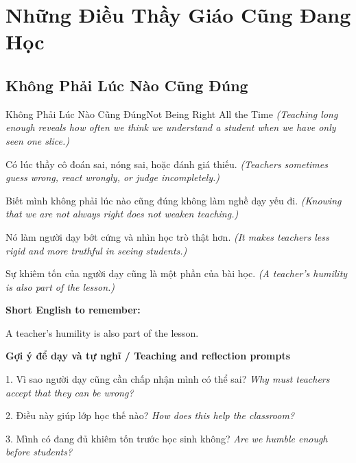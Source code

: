 \chapter{Những Điều Thầy Giáo Cũng Đang Học}

\section{Không Phải Lúc Nào Cũng Đúng}
\begin{truyen}{Không Phải Lúc Nào Cũng Đúng}{Not Being Right All the Time}
\textit{(Teaching long enough reveals how often we think we understand a student when we have only seen one slice.)}

Có lúc thầy cô đoán sai, nóng sai, hoặc đánh giá thiếu.
\textit{(Teachers sometimes guess wrong, react wrongly, or judge incompletely.)}

Biết mình không phải lúc nào cũng đúng không làm nghề dạy yếu đi.
\textit{(Knowing that we are not always right does not weaken teaching.)}

Nó làm người dạy bớt cứng và nhìn học trò thật hơn.
\textit{(It makes teachers less rigid and more truthful in seeing students.)}

\end{truyen}

\begin{baihoc}
Sự khiêm tốn của người dạy cũng là một phần của bài học.
\textit{(A teacher’s humility is also part of the lesson.)}
\end{baihoc}

\begin{ghinhoanh}
\textbf{Short English to remember:}

A teacher’s humility is also part of the lesson.

\end{ghinhoanh}

\begin{tuhocnhanh}
\textbf{Gợi ý để dạy và tự nghĩ / Teaching and reflection prompts}

1. Vì sao người dạy cũng cần chấp nhận mình có thể sai? \textit{Why must teachers accept that they can be wrong?}

2. Điều này giúp lớp học thế nào? \textit{How does this help the classroom?}

3. Mình có đang đủ khiêm tốn trước học sinh không? \textit{Are we humble enough before students?}
\end{tuhocnhanh}
\ngancach


